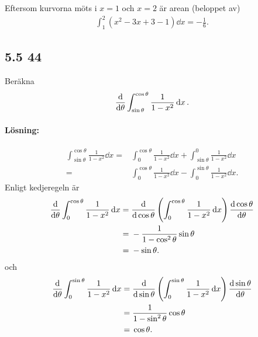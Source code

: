 Eftersom kurvorna möts i $x = 1$ och $x = 2$ är arean (beloppet av)
\begin{align*}
	\int_1^2 (x^2 - 3 x + 3 - 1) \dd{x} = -\frac{1}{6}.
\end{align*}

\subsection{5.5 44}%
\label{sub:5_5_44}

Beräkna
\begin{align*}
	\derivative{}{\theta} \int_{\sin \theta}^{\cos \theta} \frac{1}{1 - x^2} \dd{x}.
\end{align*}

\paragraph{Lösning:}

\begin{align*}
	\int_{\sin \theta}^{\cos \theta} \frac{1}{1 - x^2} \dd{x} ={}&
	\int_{0}^{\cos \theta} \frac{1}{1 - x^2} \dd{x}
	+ \int_{\sin \theta}^{0} \frac{1}{1 - x^2} \dd{x}\\
	={}& \int_{0}^{\cos \theta} \frac{1}{1 - x^2} \dd{x}
	- \int_{0}^{\sin \theta} \frac{1}{1 - x^2} \dd{x}.
\end{align*}
Enligt kedjeregeln är
\begin{align*}
	\derivative{}{\theta} \int_{0}^{\cos \theta} \frac{1}{1 - x^2} \dd{x} ={}&
	\derivative{}{\cos \theta} \left(\int_{0}^{\cos \theta} \frac{1}{1 - x^2} \dd{x}\right) \derivative{\cos \theta}{\theta}\\
	={}& -\frac{1}{1 - \cos^2 \theta} \sin \theta\\
	={}& -\sin \theta.
\end{align*}
och
\begin{align*}
	\derivative{}{\theta} \int_{0}^{\sin \theta} \frac{1}{1 - x^2} \dd{x} ={}&
	\derivative{}{\sin \theta} \left(\int_{0}^{\sin \theta} \frac{1}{1 - x^2} \dd{x}\right) \derivative{\sin \theta}{\theta}\\
	={}& \frac{1}{1 - \sin^2 \theta} \cos \theta\\
	={}& \cos \theta.
\end{align*}






